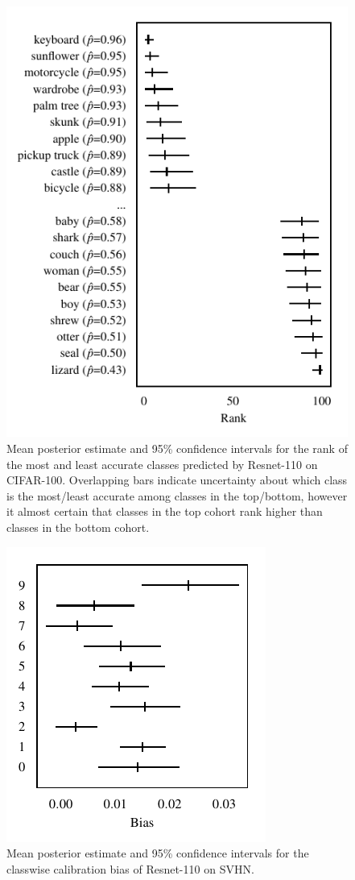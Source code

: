 \documentclass{article}
\begin{document}
\begin{figure}[t]
    \centering
    \includegraphics{figures/cifar100_rank.pdf}
    \caption{
        Mean posterior estimate and 95\% confidence intervals for the rank of the most and least accurate classes predicted by Resnet-110 on CIFAR-100.
        Overlapping bars indicate uncertainty about which class is the most/least accurate among classes in the top/bottom, however it almost certain that classes in the top cohort rank higher than classes in the bottom cohort.
    }
    \label{fig:cifar100_rank}
\end{figure}

\begin{figure}[t]
    \centering
    \includegraphics{figures/svhn_bias.pdf}
    \caption{
        Mean posterior estimate and 95\% confidence intervals for the classwise calibration bias of Resnet-110 on SVHN.
    }
    \label{fig:svhn_bias}
\end{figure}
\end{document}
